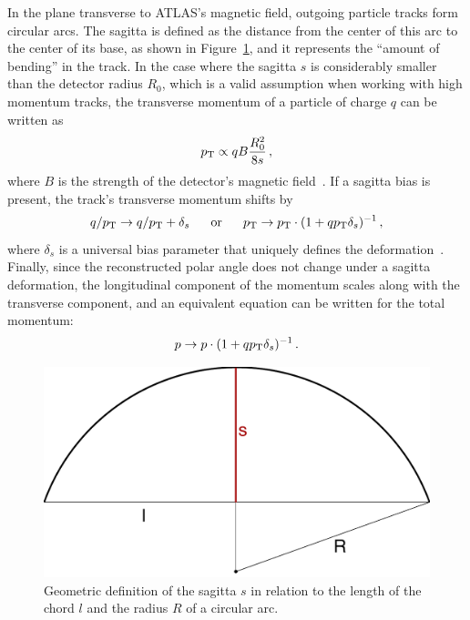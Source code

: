 In the plane transverse to ATLAS's magnetic field, outgoing particle tracks form circular arcs.
The sagitta is defined as the distance from the center of this arc to the center of its base, as shown in Figure~\ref{fig:align_sagitta}, and it represents the ``amount of bending'' in the track.
In the case where the sagitta $s$ is considerably smaller than the detector radius $R_0$, which is a valid assumption when working with high momentum tracks, the transverse momentum of a particle of charge $q$ can be written as
\begin{equation}
  \pt \propto q B \frac{R_0^2}{8s}\,,
  \label{eq:align_pt_sagitta}
\end{equation}
where $B$ is the strength of the detector's magnetic field~\cite{2018.alignment-radial-distortions}.
If a sagitta bias is present, the track's transverse momentum shifts by
\begin{equation}
  q/\pt\rightarrow q/\pt+\delta_s ~~~~~\textrm{or}~~~~~ \pt\rightarrow \pt\cdot(1+q\pt\delta_s)^{-1}\,,
  \label{eq:align_pt_sagitta_bias}
\end{equation}
where $\delta_s$ is a universal bias parameter that uniquely defines the deformation~\cite{2012.alignment-systematics}.
Finally, since the reconstructed polar angle does not change under a sagitta deformation, the longitudinal component of the momentum scales along with the transverse component, and an equivalent equation can be written for the total momentum:
\begin{equation}
  p\rightarrow p\cdot(1+q\pt\delta_s)^{-1}\,.
  \label{eq:align_p_sagitta_bias}
\end{equation}

\begin{figure}[htbp]
  \centering
  \includegraphics[width=.4\textwidth]{figs/alignment/sagitta}
  \caption{Geometric definition of the sagitta $s$ in relation to the length of the chord $l$ and the radius $R$ of a circular arc.}
  \label{fig:align_sagitta}
\end{figure}

